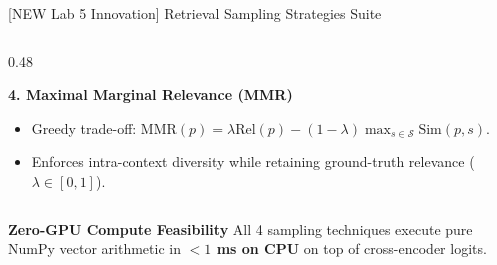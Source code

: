 \documentclass[10pt,aspectratio=169]{beamer}
\begin{document}
\begin{frame}{[NEW Lab 5 Innovation] Retrieval Sampling Strategies Suite}
\begin{columns}[onlytextwidth,T]
\begin{column}{0.48\textwidth}
            \vspace{0.12cm}
            \begin{block}{\textbf{4. Maximal Marginal Relevance (MMR)}}
                \scriptsize
                \begin{itemize}\setlength\itemsep{1.5pt}
                    \item Greedy trade-off: $\text{MMR}(p) = \lambda \text{Rel}(p) - (1-\lambda) \max_{s \in \mathcal{S}} \text{Sim}(p, s)$.
                    \item Enforces intra-context diversity while retaining ground-truth relevance ($\lambda \in [0, 1]$).
                \end{itemize}
            \end{block}
        \end{column}
    \end{columns}

    \vspace{0.15cm}
    \begin{exampleblock}{\textbf{Zero-GPU Compute Feasibility}}
        \centering
        \footnotesize
        All 4 sampling techniques execute pure NumPy vector arithmetic in \textbf{$<1$ ms on CPU} on top of cross-encoder logits.
    \end{exampleblock}
\end{frame}
\end{document}
